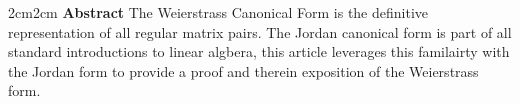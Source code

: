 \begin{adjustwidth}{2cm}{2cm}
\textbf{Abstract}
The Weierstrass Canonical Form is the definitive representation of all regular matrix pairs.
The Jordan canonical form is part of all standard introductions to linear algbera, this article leverages this familairty with the Jordan form to provide a proof and therein exposition of the Weierstrass form. 
\end{adjustwidth}